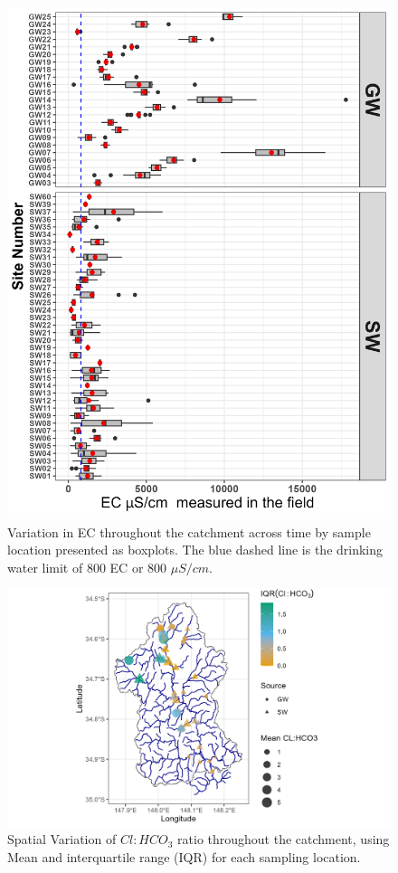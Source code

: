 \documentclass[, manuscript]{copernicus}
\begin{document}
\clearpage

\begin{figure}
\includegraphics[width=0.8\linewidth]{Figures/ec_plot} \caption{Variation in EC throughout the catchment across time by sample location presented as boxplots. The blue dashed line is the drinking water limit of 800 EC or 800 $\mu S/cm$.}\label{fig:ECboxplot}
\end{figure}

\clearpage

\begin{figure}
\includegraphics[width=0.8\linewidth]{Figures/clhco3_map} \caption{Spatial Variation of $Cl:HCO_3$ ratio throughout the catchment, using Mean and interquartile range (IQR) for each sampling location.}\label{fig:Carbonate-map}
\end{figure}
\end{document}
